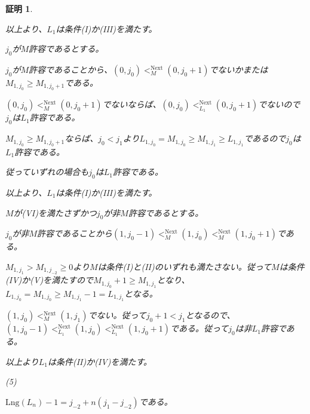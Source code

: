 \documentclass[dvipdfmx,uplatex]{jsarticle}
\theoremstyle{customnonumberbreakfortheorem}
\theoremstyle{customnonumberbreakforproof}
\newtheorem{hideableproof}{証明}
\newcommand{\qedhere}{\hfill\hideableproofSymbol}
\begin{document}
\begin{hideableproof}
\begin{indented}
\begin{indented}
			\item 以上より、\(L_1\)は条件(I)か(III)を満たす。
		\end{indented}
		\item \(j_0\)が\(M\)許容であるとする。
		\begin{indented}
			\item \(j_0\)が\(M\)許容であることから、\((0,j_0) <_M^{\textrm{Next}} (0,j_0+1)\)でないかまたは\(M_{1,j_0} \geq M_{1,j_0+1}\)である。
			\item \((0,j_0) <_M^{\textrm{Next}} (0,j_0+1)\)でないならば、\((0,j_0) <_{L_1}^{\textrm{Next}} (0,j_0+1)\)でないので\(j_0\)は\(L_1\)許容である。
			\item \(M_{1,j_0} \geq M_{1,j_0+1}\)ならば、\(j_0 < j_1\)より\(L_{1,j_0} = M_{1,j_0} \geq M_{1,j_1} \geq L_{1,j_1}\)であるので\(j_0\)は\(L_1\)許容である。
			\item 従っていずれの場合も\(j_0\)は\(L_1\)許容である。
			\item 以上より、\(L_1\)は条件(I)か(III)を満たす。
		\end{indented}
		\item \(M\)が(VI)を満たさずかつ\(j_0\)が非\(M\)許容であるとする。
		\begin{indented}
			\item \(j_0\)が非\(M\)許容であることから\((1,j_0-1) <_M^{\textrm{Next}} (1,j_0) <_M^{\textrm{Next}} (1,j_0+1)\)である。
			\item \(M_{1,j_1} > M_{1,j_{-2}} \geq 0\)より\(M\)は条件(I)と(II)のいずれも満たさない。従って\(M\)は条件(IV)か(V)を満たすので\(M_{1,j_0}+1 \geq M_{1,j_1}\)となり、\(L_{1,j_0} = M_{1,j_0} \geq M_{1,j_1}-1 = L_{1,j_1}\)となる。
		\end{indented}
	\end{indented}
	\((1,j_0) <_M^{\textrm{Next}} (1,j_1)\)でない。従って\(j_0+1 < j_1\)となるので、\((1,j_0-1) <_{L_1}^{\textrm{Next}} (1,j_0) <_{L_1}^{\textrm{Next}} (1,j_0+1)\)である。従って\(j_0\)は非\(L_1\)許容である。
	\begin{indented}
		\item
		\begin{indented}
			\item 以上より\(L_1\)は条件(II)か(IV)を満たす。\qedhere
		\end{indented}
		\item
		\item (5)
	\end{indented}
	\(\textrm{Lng}(L_n)-1 = j_{-2}+n(j_1-j_{-2})\)である。
	\begin{indented}

\end{indented}
\end{hideableproof}
\end{document}
